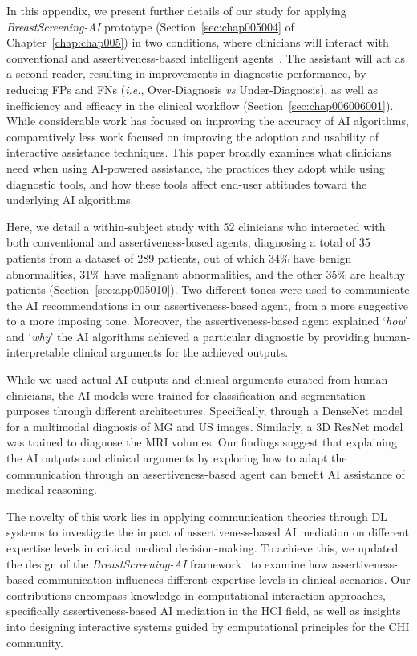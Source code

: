 In this appendix, we present further details of our study for applying {\it BreastScreening-AI} prototype (Section~\ref{sec:chap005004} of Chapter~\ref{chap:chap005}) in two conditions, where clinicians will interact with conventional and assertiveness-based intelligent agents~\cite{pacheco2019alignment, 10.1145/3311350.3347162}.
The assistant will act as a second reader, resulting in improvements in diagnostic performance, by reducing \acp{FP} and \acp{FN} ({\it i.e.}, Over-Diagnosis {\it vs} Under-Diagnosis), as well as inefficiency and efficacy in the clinical workflow (Section~\ref{sec:chap006006001}).
While considerable work has focused on improving the accuracy of \ac{AI} algorithms, comparatively less work focused on improving the adoption and usability of interactive assistance techniques.
This paper broadly examines what clinicians need when using \ac{AI}-powered assistance, the practices they adopt while using diagnostic tools, and how these tools affect end-user attitudes toward the underlying \ac{AI} algorithms.

Here, we detail a within-subject study with 52 clinicians who interacted with both conventional and assertiveness-based agents, diagnosing a total of 35 patients from a dataset of 289 patients, out of which 34\% have benign abnormalities, 31\% have malignant abnormalities, and the other 35\% are healthy patients (Section~\ref{sec:app005010}).
Two different tones were used to communicate the \ac{AI} recommendations in our assertiveness-based agent, from a more suggestive to a more imposing tone.
Moreover, the assertiveness-based agent explained `{\it how}' and `{\it why}' the \ac{AI} algorithms achieved a particular diagnostic by providing human-interpretable clinical arguments for the achieved outputs.

While we used actual \ac{AI} outputs and clinical arguments curated from human clinicians, the \ac{AI} models were trained for classification and segmentation purposes through different architectures.
Specifically, through a DenseNet model~\cite{8721151} for a multimodal diagnosis of \ac{MG} and \ac{US} images.
Similarly, a 3D ResNet model~\cite{Aldoj2020} was trained to diagnose the \ac{MRI} volumes.
Our findings suggest that explaining the \ac{AI} outputs and clinical arguments by exploring how to adapt the communication through an assertiveness-based agent can benefit \ac{AI} assistance of medical reasoning.

The novelty of this work lies in applying communication theories through \ac{DL} systems to investigate the impact of assertiveness-based \ac{AI} mediation on different expertise levels in critical medical decision-making.
To achieve this, we updated the design of the {\it BreastScreening-AI} framework~\cite{CALISTO2022102285} to examine how assertiveness-based communication influences different expertise levels in clinical scenarios.
Our contributions encompass knowledge in computational interaction approaches, specifically assertiveness-based \ac{AI} mediation in the \ac{HCI} field, as well as insights into designing interactive systems guided by computational principles for the \ac{CHI} community.

